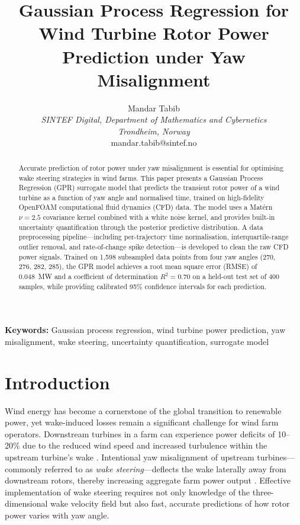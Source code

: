 \documentclass[12pt]{article}
\title{Gaussian Process Regression for Wind Turbine Rotor Power Prediction under Yaw Misalignment}
\author{
  Mandar Tabib \\
  \textit{SINTEF Digital, Department of Mathematics and Cybernetics} \\
  \textit{Trondheim, Norway} \\
  mandar.tabib@sintef.no
}
\date{}
\begin{document}
\maketitle

\begin{abstract}
Accurate prediction of rotor power under yaw misalignment is essential for optimising wake steering strategies in wind farms.
This paper presents a Gaussian Process Regression (GPR) surrogate model that predicts the transient rotor power of a wind turbine as a function of yaw angle and normalised time, trained on high-fidelity OpenFOAM computational fluid dynamics (CFD) data.
The model uses a Mat\'{e}rn~$\nu = 2.5$ covariance kernel combined with a white noise kernel, and provides built-in uncertainty quantification through the posterior predictive distribution.
A data preprocessing pipeline---including per-trajectory time normalisation, interquartile-range outlier removal, and rate-of-change spike detection---is developed to clean the raw CFD power signals.
Trained on 1{,}598 subsampled data points from four yaw angles (270\textdegree, 276\textdegree, 282\textdegree, 285\textdegree), the GPR model achieves a root mean square error (RMSE) of 0.048~MW and a coefficient of determination $R^2 = 0.70$ on a held-out test set of 400 samples, while providing calibrated 95\% confidence intervals for each prediction.
\end{abstract}

\noindent\textbf{Keywords:} Gaussian process regression, wind turbine power prediction, yaw misalignment, wake steering, uncertainty quantification, surrogate model

\section{Introduction}
\label{sec:introduction}

Wind energy has become a cornerstone of the global transition to renewable power, yet wake-induced losses remain a significant challenge for wind farm operators.
Downstream turbines in a farm can experience power deficits of 10--20\% due to the reduced wind speed and increased turbulence within the upstream turbine's wake \citep{Barthelmie2009,PorteAgel2020}.
Intentional yaw misalignment of upstream turbines---commonly referred to as \emph{wake steering}---deflects the wake laterally away from downstream rotors, thereby increasing aggregate farm power output \citep{Fleming2017,Gebraad2016}.
Effective implementation of wake steering requires not only knowledge of the three-dimensional wake velocity field but also fast, accurate predictions of how rotor power varies with yaw angle.
\end{document}
